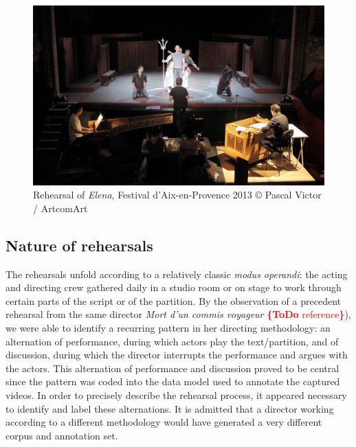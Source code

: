 \documentclass[conference]{IEEEtran}
\newcommand{\todo}[1]{\noindent\textcolor{red}{{\bf \{ToDo} #1{\bf \}}}}
\begin{document}
\begin{figure}[htb!]
  \centering
  \includegraphics[width=\columnwidth]{elena}
  \caption{Rehearsal of \emph{Elena}, Festival d’Aix-en-Provence 2013 © Pascal Victor / ArtcomArt}
  \label{fig:elena}
\end{figure}


\subsection{Nature of rehearsals}

The rehearsals unfold according to a relatively classic \emph{modus operandi}: the acting and directing crew gathered daily in a studio room or on stage to work through certain parts of the script or of the partition. By the observation of a precedent rehearsal from the same director \emph{Mort d'un commis voyageur} \todo{reference}), we were able to identify a recurring pattern in her directing methodology: an alternation of performance, during which actors play the text/partition, and of discussion, during which the director interrupts the performance and argues with the actors. This alternation of performance and discussion proved to be central since the pattern was coded into the data model used to annotate the captured videos.
In order to precisely describe the rehearsal process, it appeared necessary to identify and label these alternations.
It is admitted that a director working according to a different methodology would have generated a very different corpus and annotation set.

%
%
\end{document}
